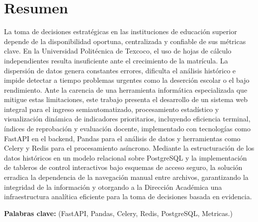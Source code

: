 \section*{Resumen}

La toma de decisiones estratégicas en las instituciones de educación superior depende de la disponibilidad oportuna, centralizada y confiable de sus métricas clave. En la Universidad Politécnica de Texcoco, el uso de hojas de cálculo independientes resulta insuficiente ante el crecimiento de la matrícula. La dispersión de datos genera constantes errores, dificulta el análisis histórico e impide detectar a tiempo problemas urgentes como la deserción escolar o el bajo rendimiento. Ante la carencia de una herramienta informática especializada que mitigue estas limitaciones, este trabajo presenta el desarrollo de un sistema web integral para el ingreso semiautomatizado, procesamiento estadístico y visualización dinámica de indicadores prioritarios, incluyendo eficiencia terminal, índices de reprobación y evaluación docente, implementado con tecnologías como FastAPI en el backend, Pandas para el análisis de datos y herramientas como Celery y Redis para el procesamiento asíncrono. Mediante la estructuración de los datos históricos en un modelo relacional sobre PostgreSQL y la implementación de tableros de control interactivos bajo esquemas de acceso seguro, la solución erradica la dependencia de la navegación manual entre archivos, garantizando la integridad de la información y otorgando a la Dirección Académica una infraestructura analítica eficiente para la toma de decisiones basada en evidencia.

\vspace{5cm}\textbf{Palabras clave:} (FastAPI, Pandas, Celery, Redis, PostgreSQL, Metricas.)